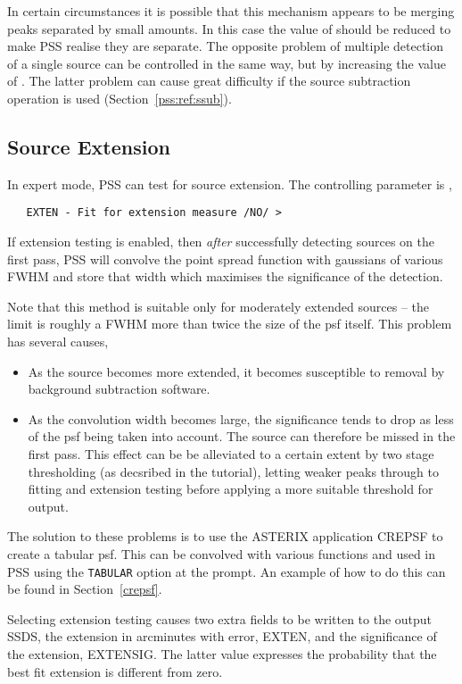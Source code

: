 In certain circumstances it is possible that this mechanism appears to be
merging peaks separated by small amounts. In this case the value
of  should be reduced to make PSS realise they are separate.
The opposite problem of multiple detection of a single source can be
controlled in the same way, but by increasing the value of .
The latter problem can cause great difficulty if the source subtraction
operation is used (Section~\ref{pss:ref:ssub}).

\subsection{Source Extension}
\label{pss:ref:exten}
In expert  mode, PSS can test for source extension. The 
controlling parameter is ,
\begin{verbatim}
   EXTEN - Fit for extension measure /NO/ >
\end{verbatim}
If extension testing is enabled, then {\em after} successfully detecting sources
on the first pass,
PSS will convolve the point spread function with gaussians of various FWHM
and store that width which maximises the significance of the detection.

Note that this method is suitable only for moderately extended sources -- the
limit is roughly a FWHM more than twice the size of the psf itself. This
problem has several causes,
\begin{itemize}
\item As the source becomes more extended, it becomes susceptible to removal
by background subtraction software.
\item As the convolution width becomes large, the significance tends to drop
as less of the psf being taken into account. The source can therefore be
missed in the first pass. This effect can be be alleviated to a certain
extent by two stage thresholding (as decsribed in the tutorial), letting
weaker peaks through to fitting and extension testing before applying a
more suitable threshold for output.
\end{itemize}

The solution to these problems is to use the ASTERIX application CREPSF to
create
a tabular psf. This can be convolved with various functions and used in PSS
using the \verb+TABULAR+ option at the  prompt. An example of
how to do this can be found in Section~\ref{crepsf}.

Selecting extension testing causes two extra fields to be written to the
output SSDS, the extension in arcminutes with error, EXTEN, and the 
significance of the extension, EXTENSIG. The latter value expresses the
probability that the best fit extension is different from zero.

